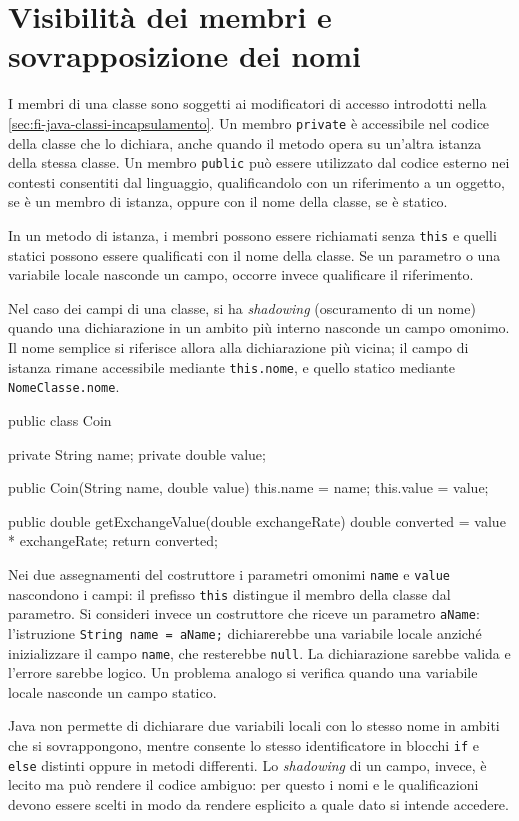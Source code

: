 \section{Visibilità dei membri e sovrapposizione dei nomi}
\label{sec:fi-java-cicli-shadowing}

I membri di una classe sono soggetti ai modificatori di accesso
introdotti nella \cref{sec:fi-java-classi-incapsulamento}.
Un membro \texttt{private} è accessibile nel codice della
classe che lo dichiara, anche quando il metodo opera su
un'altra istanza della stessa classe. Un membro \texttt{public}
può essere utilizzato dal codice esterno nei contesti consentiti
dal linguaggio, qualificandolo con un riferimento a un oggetto,
se è un membro di istanza, oppure con il nome della classe,
se è statico.

In un metodo di istanza, i membri possono essere richiamati
senza \texttt{this} e quelli statici possono essere qualificati
con il nome della classe. Se un parametro o una variabile locale
nasconde un campo, occorre invece qualificare il riferimento.

\begin{definition}[Shadowing]
\label{def:fi-java-cicli-shadowing}
Nel caso dei campi di una classe, si ha \emph{shadowing}
(oscuramento di un nome) quando una dichiarazione in un ambito
più interno nasconde un campo omonimo. Il nome semplice si riferisce allora
alla dichiarazione più vicina; il campo di istanza rimane
accessibile mediante \texttt{this.nome}, e quello statico
mediante \texttt{NomeClasse.nome}.
\end{definition}

\begin{unipdcode}[language=Java]
public class Coin {
    private String name;
    private double value;

    public Coin(String name, double value) {
        this.name = name;
        this.value = value;
    }

    public double getExchangeValue(double exchangeRate) {
        double converted = value * exchangeRate;
        return converted;
    }
}
\end{unipdcode}

Nei due assegnamenti del costruttore i parametri omonimi
\texttt{name} e \texttt{value} nascondono i campi: il prefisso
\texttt{this} distingue il membro della classe dal parametro.
Si consideri invece un costruttore che riceve un parametro
\texttt{aName}: l'istruzione \texttt{String name = aName;}
dichiarerebbe una variabile locale anziché inizializzare il campo
\texttt{name}, che resterebbe \texttt{null}. La dichiarazione
sarebbe valida e l'errore sarebbe logico. Un problema analogo
si verifica quando una variabile locale nasconde un campo statico.

Java non permette di dichiarare due variabili locali con lo
stesso nome in ambiti che si sovrappongono, mentre consente
lo stesso identificatore in blocchi \texttt{if} e \texttt{else}
distinti oppure in metodi differenti. Lo \emph{shadowing} di
un campo, invece, è lecito ma può rendere il codice ambiguo:
per questo i nomi e le qualificazioni devono essere scelti in
modo da rendere esplicito a quale dato si intende accedere.
